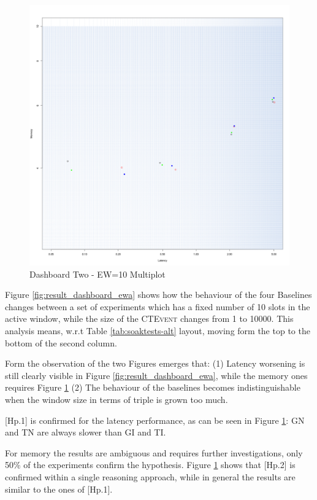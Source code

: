 \begin{figure}[htb]
	\centering
	\includegraphics[width=0.90\linewidth]{images/dashboard-2}	
	\caption[\textsc{Analyser} Investigation Stack - Level 0 - Dashboard Two - Multiplot Version]{Dashboard Two - EW=10 Multiplot} 
	\label{fig:result_dashboard_ewb}
\end{figure}


Figure \ref{fig:result_dashboard_ewa} shows how the behaviour of the four Baselines changes between a set of experiments which has a fixed number of 10 slots in the active window, while the size of the \textsc{CTEvent} changes from 1 to 10000. This analysis means, w.r.t Table \ref{tab:soaktests-alt} layout, moving form the top to the bottom of the second column.

Form the observation of the two Figures emerges that: (1) Latency worsening is still clearly visible in Figure \ref{fig:result_dashboard_ewa}, while the memory ones requires Figure \ref{fig:result_dashboard_ewb} (2) The behaviour of the baselines becomes indistinguishable when the window size in terms of triple is grown too much. 

[Hp.1] is confirmed for the latency performance, as can be seen in Figure \ref{fig:result_dashboard_ewb}: GN and TN are always slower than GI and TI. 

For memory the results are ambiguous and requires further investigations, only 50\% of the experiments confirm the hypothesis. Figure \ref{fig:result_dashboard_ewb} shows that [Hp.2] is confirmed within a single reasoning approach, while in general the results are similar to the ones of [Hp.1].

